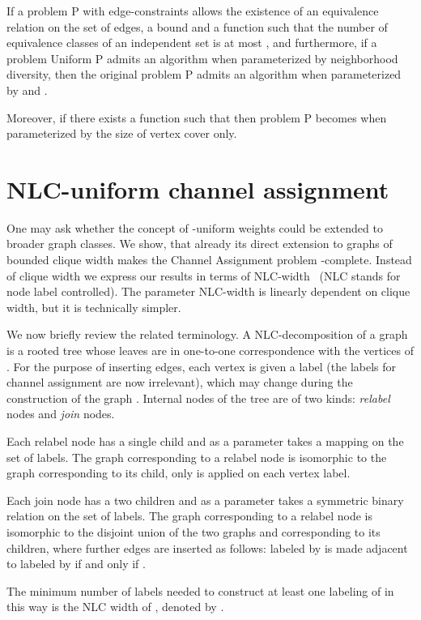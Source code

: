 \documentclass[a4paper,UKenglish]{lipics}
\newcommand{\NP}{{\sf{NP}}\xspace}
\newcommand{\FPT}{{\sf{FPT}}\xspace}
\theoremstyle{plain}
\theoremstyle{definition}
\begin{document}
{If a problem {\sc P} with edge-constraints allows the existence of an
equivalence relation  on the set of edges, a bound  and a function
 such that the number of equivalence
classes of an independent set is at most , and
furthermore, if a problem {\sc Uniform P} admits an \FPT algorithm
when parameterized by neighborhood diversity, then the original problem {\sc P}
admits an \FPT algorithm when parameterized by  and .

Moreover, if there exists a function  such that  then problem {\sc P} becomes \FPT when parameterized by the size of vertex cover only.

\fi
 \section{NLC-uniform channel assignment}

One may ask whether the concept of -uniform weights could be extended to broader graph classes.
We show, that already its direct extension to graphs of bounded clique width makes the 
{\sc Channel Assignment} problem \NP-complete. Instead of clique width we express our 
results in terms of NLC-width~\cite{t:Wanke94} (NLC stands for node label controlled). 
The parameter NLC-width is linearly dependent on clique width, but it is technically simpler.

We now briefly review the related terminology. 
A NLC-decomposition of a graph  is a rooted tree whose leaves are in one-to-one correspondence 
with the vertices of . For the purpose of inserting edges, each vertex is given a label 
(the labels for channel assignment are now irrelevant), which may change during the construction of the graph .
Internal nodes of the tree are of two kinds: \emph{relabel} nodes and \emph{join} nodes.

Each relabel node has a single child and as a parameter takes a mapping  on the set of labels.
The graph corresponding to a relabel node is isomorphic to the graph corresponding to its child,
only  is applied on each vertex label.

Each join node has a two children and as a parameter takes a symmetric binary relation  on the set of labels.
The graph corresponding to a relabel node is isomorphic to the disjoint union of the two graphs  and 
corresponding to its children, where further edges are inserted as follows: 
 labeled by  is made adjacent to  labeled by  if and only if .

The minimum number of labels needed to construct at least one labeling of  
in this way is the NLC width of , denoted by .

}
\end{document}
